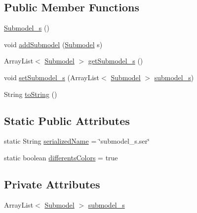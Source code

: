 \subsection*{Public Member Functions}
\begin{DoxyCompactItemize}
\item 
\hyperlink{classit_1_1isislab_1_1masonassisteddocumentation_1_1_o_d_d_1_1_submodel__s_a206eca2f400cc582222c96449a6884dc}{Submodel\-\_\-s} ()
\item 
void \hyperlink{classit_1_1isislab_1_1masonassisteddocumentation_1_1_o_d_d_1_1_submodel__s_a9d794fc61978e269061bc32ab21aef9b}{add\-Submodel} (\hyperlink{classit_1_1isislab_1_1masonassisteddocumentation_1_1_o_d_d_1_1_submodel}{Submodel} s)
\item 
Array\-List$<$ \hyperlink{classit_1_1isislab_1_1masonassisteddocumentation_1_1_o_d_d_1_1_submodel}{Submodel} $>$ \hyperlink{classit_1_1isislab_1_1masonassisteddocumentation_1_1_o_d_d_1_1_submodel__s_af835b4d42da6393b22f991b79ea32236}{get\-Submodel\-\_\-s} ()
\item 
void \hyperlink{classit_1_1isislab_1_1masonassisteddocumentation_1_1_o_d_d_1_1_submodel__s_a78badc90246f27cc1dc5539f61d2e949}{set\-Submodel\-\_\-s} (Array\-List$<$ \hyperlink{classit_1_1isislab_1_1masonassisteddocumentation_1_1_o_d_d_1_1_submodel}{Submodel} $>$ \hyperlink{classit_1_1isislab_1_1masonassisteddocumentation_1_1_o_d_d_1_1_submodel__s_a0a87b09550e1e4503c7eaad25838543d}{submodel\-\_\-s})
\item 
String \hyperlink{classit_1_1isislab_1_1masonassisteddocumentation_1_1_o_d_d_1_1_submodel__s_aaef6a78efd50526e52b6fb83b4222f11}{to\-String} ()
\end{DoxyCompactItemize}
\subsection*{Static Public Attributes}
\begin{DoxyCompactItemize}
\item 
static String \hyperlink{classit_1_1isislab_1_1masonassisteddocumentation_1_1_o_d_d_1_1_submodel__s_a7b9cf4ddeacb2ad2206a2e309ebd297b}{serialized\-Name} = \char`\"{}submodel\-\_\-s.\-ser\char`\"{}
\item 
static boolean \hyperlink{classit_1_1isislab_1_1masonassisteddocumentation_1_1_o_d_d_1_1_submodel__s_adfe49ada88df75cac690d3cdd91b4c9d}{differents\-Colors} = true
\end{DoxyCompactItemize}
\subsection*{Private Attributes}
\begin{DoxyCompactItemize}
\item 
Array\-List$<$ \hyperlink{classit_1_1isislab_1_1masonassisteddocumentation_1_1_o_d_d_1_1_submodel}{Submodel} $>$ \hyperlink{classit_1_1isislab_1_1masonassisteddocumentation_1_1_o_d_d_1_1_submodel__s_a0a87b09550e1e4503c7eaad25838543d}{submodel\-\_\-s}
\end{DoxyCompactItemize}
